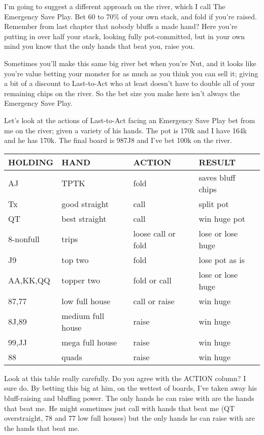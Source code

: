 I'm going to suggest a different approach on the river, which I call
The Emergency Save Play. Bet 60 to 70\% of your own stack, and fold if
you're raised. Remember from last chapter that nobody bluffs a made
hand? Here you're putting in over half your stack, looking fully
pot-committed, but in your own mind you know that the only hands that
beat you, raise you.

Sometimes you'll make this same big river bet when you're Nut, and it
looks like you're value betting your monster for as much as you think
you can sell it; giving a bit of a discount to Last-to-Act who at
least doesn't have to double all of your remaining chips on the
river. So the bet size you make here isn't always the Emergency Save
Play.

Let's look at the actions of Last-to-Act facing an Emergency Save Play
bet from me on the river; given a variety of his hands. The pot is
170k and I have 164k and he has 170k. The final board is 987J8 and
I've bet 100k on the river.

\begin{tabular}{|l|l|l|l|} \hline
HOLDING & HAND & ACTION & RESULT\\ \hline
AJ      & TPTK & fold   & saves bluff chips\\ \hline
Tx      & good straight & call & split pot\\ \hline
QT      & best straight & call & win huge pot\\ \hline
8-nonfull & trips & loose call or fold & lose or lose huge\\ \hline
J9      & top two       & fold & lose pot as is\\ \hline
AA,KK,QQ & topper two   & fold or call & lose or lose huge\\ \hline
87,77 & low full house   & call or raise & win huge\\ \hline
8J,89 & medium full house   & raise & win huge\\ \hline
99,JJ & mega full house & raise & win huge\\ \hline
88      & quads            & raise & win huge\\ \hline
\end{tabular}

Look at this table really carefully. Do you agree with the ACTION
column? I sure do. By betting this big at him, on the wettest of
boards, I've taken away his bluff-raising and bluffing power. The only
hands he can raise with are the hands that beat me. He might sometimes
just call with hands that beat me (QT overstraight, 78 and 77 low full
houses) but the only hands he can raise with are the hands that beat
me.

